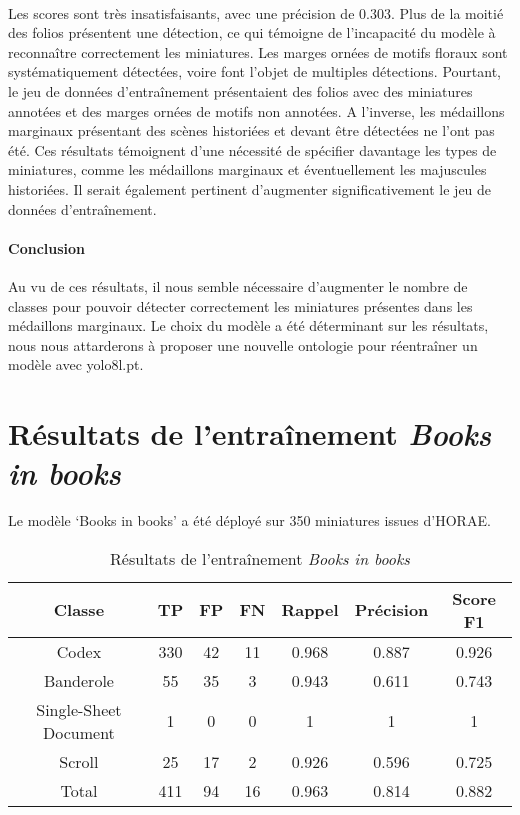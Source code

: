 \documentclass[12pt,twoside]{book}
\begin{document}
\paragraph{}Les scores sont très insatisfaisants, avec une précision de 0.303. Plus de la moitié des folios présentent une détection, ce qui témoigne de l’incapacité du modèle à reconnaître correctement les miniatures. Les marges ornées de motifs floraux sont systématiquement détectées, voire font l’objet de multiples détections. Pourtant, le jeu de données d’entraînement présentaient des folios avec des miniatures annotées et des marges ornées de motifs non annotées. A l’inverse, les médaillons marginaux présentant des scènes historiées et devant être détectées ne l’ont pas été. Ces résultats témoignent d’une nécessité de spécifier davantage les types de miniatures, comme les médaillons marginaux et éventuellement les majuscules historiées. Il serait également pertinent d’augmenter significativement le jeu de données d’entraînement. \\

\paragraph{Conclusion}Au vu de ces résultats, il nous semble nécessaire d’augmenter le nombre de classes pour pouvoir détecter correctement les miniatures présentes dans les médaillons marginaux. Le choix du modèle a été déterminant sur les résultats, nous nous attarderons à proposer une nouvelle ontologie pour réentraîner un modèle avec yolo8l.pt.


\section{Résultats de l'entraînement \textit{Books in books}}

Le modèle ‘Books in books’ a été déployé sur 350 miniatures issues d’HORAE.


\begin{table}[ht]
    \centering
    \begin{tabular}{|c|c|c|c|c|c|c|}
    \hline
    \textbf{Classe} & \textbf{TP} & \textbf{FP} & \textbf{FN} & \textbf{Rappel} & \textbf{Précision} & \textbf{Score F1} \\
    \hline
    Codex & 330 & 42 & 11 & 0.968 & 0.887 & 0.926 \\ 
    \hline
    Banderole & 55 & 35 & 3 & 0.943 & 0.611 & 0.743 \\ 
    \hline
    Single-Sheet Document & 1 & 0 & 0 & 1 & 1 & 1 \\ 
    \hline
    Scroll & 25 & 17 & 2 & 0.926 & 0.596 & 0.725 \\ 
    \hline
    Total & 411 & 94 & 16 & 0.963 & 0.814 & 0.882 \\ 
    \hline
    \end{tabular}
    \caption{Résultats de l'entraînement \textit{Books in books}}
\end{table}
\end{document}
